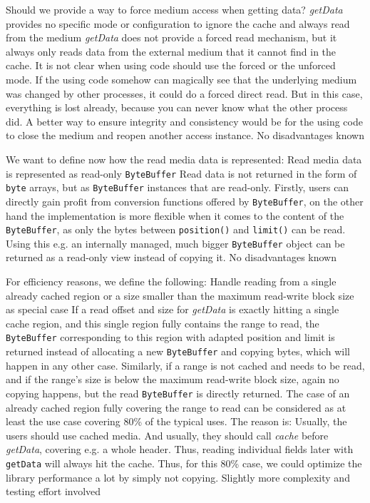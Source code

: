 Should we provide a way to force medium access when getting data?
{%
\emph{getData} provides no specific mode or configuration to ignore the cache and always read from the medium
}
{%
\emph{getData} does not provide a forced read mechanism, but it always only reads data from the external medium that it cannot find in the cache.
}
{%
It is not clear when using code should use the forced or the unforced mode. If the using code somehow can magically see that the underlying medium was changed by other processes, it could do a forced direct read. But in this case, everything is lost already, because you can never know what the other process did. A better way to ensure integrity and consistency would be for the using code to close the medium and reopen another access instance.
}
{%
No disadvantages known
}

We want to define now how the read media data is represented:
{%
Read media data is represented as read-only \texttt{ByteBuffer}
}
{%
Read data is not returned in the form of \texttt{byte} arrays, but as \texttt{ByteBuffer} instances that are read-only.
}
{%
Firstly, users can directly gain profit from conversion functions offered by \texttt{ByteBuffer}, on the other hand the implementation is more flexible when it comes to the content of the \texttt{ByteBuffer}, as only the bytes between \texttt{position()} and \texttt{limit()} can be read. Using this e.g. an internally managed, much bigger \texttt{ByteBuffer} object can be returned as a read-only view instead of copying it.
}
{%
No disadvantages known
}

For efficiency reasons, we define the following:
{%
Handle reading from a single already cached region or a size smaller than the maximum read-write block size as special case
}
{%
If a read offset and size for \emph{getData} is exactly hitting a single cache region, and this single region fully contains the range to read, the \texttt{ByteBuffer} corresponding to this region with adapted position and limit is returned instead of allocating a new \texttt{ByteBuffer} and copying bytes, which will happen in any other case. Similarly, if a range is not cached and needs to be read, and if the range's size is below the maximum read-write block size, again no copying happens, but the read \texttt{ByteBuffer} is directly returned.
}
{%
The case of an already cached region fully covering the range to read can be considered as at least the use case covering 80\% of the typical uses. The reason is: Usually, the users should use cached media. And usually, they should call \emph{cache} before \emph{getData}, covering e.g. a whole header. Thus, reading individual fields later with \texttt{getData} will always hit the cache. Thus, for this 80\% case, we could optimize the library performance a lot by simply not copying.
}
{%
Slightly more complexity and testing effort involved
}

